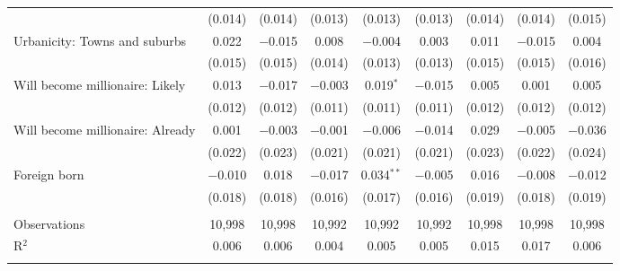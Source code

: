 \begin{tabular}{@{\extracolsep{5pt}}lcccccccc}
  & (0.014) & (0.014) & (0.013) & (0.013) & (0.013) & (0.014) & (0.014) & (0.015) \\ 
  Urbanicity: Towns and suburbs & 0.022 & $-$0.015 & 0.008 & $-$0.004 & 0.003 & 0.011 & $-$0.015 & 0.004 \\ 
  & (0.015) & (0.015) & (0.014) & (0.013) & (0.013) & (0.015) & (0.015) & (0.016) \\ 
  Will become millionaire: Likely & 0.013 & $-$0.017 & $-$0.003 & 0.019$^{*}$ & $-$0.015 & 0.005 & 0.001 & 0.005 \\ 
  & (0.012) & (0.012) & (0.011) & (0.011) & (0.011) & (0.012) & (0.012) & (0.012) \\ 
  Will become millionaire: Already & 0.001 & $-$0.003 & $-$0.001 & $-$0.006 & $-$0.014 & 0.029 & $-$0.005 & $-$0.036 \\ 
  & (0.022) & (0.023) & (0.021) & (0.021) & (0.021) & (0.023) & (0.022) & (0.024) \\ 
  Foreign born & $-$0.010 & 0.018 & $-$0.017 & 0.034$^{**}$ & $-$0.005 & 0.016 & $-$0.008 & $-$0.012 \\ 
  & (0.018) & (0.018) & (0.016) & (0.017) & (0.016) & (0.019) & (0.018) & (0.019) \\ 
 \hline \\[-1.8ex] 

Observations & 10,998 & 10,998 & 10,992 & 10,992 & 10,992 & 10,998 & 10,998 & 10,998 \\ 
R$^{2}$ & 0.006 & 0.006 & 0.004 & 0.005 & 0.005 & 0.015 & 0.017 & 0.006 \\ 
\hline 
\hline \\[-1.8ex] 
\end{tabular} 